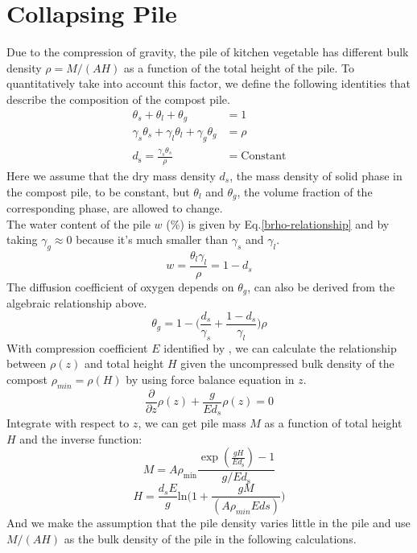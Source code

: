 \documentclass[12pt, letterpaper, titlepage]{article}
\begin{document}
\section{Collapsing Pile}
Due to the compression of gravity, the pile of kitchen vegetable has different bulk density $\rho=M/(AH)$ as a function of the total height of the pile. To quantitatively take into account this factor, we define the following identities that describe the composition of the compost pile.
\begin{align}
    \theta_s+\theta_l+\theta_g &= 1 \\
    \gamma_s\theta_s+\gamma_l\theta_l+\gamma_g\theta_g &= \rho \label{brho-relationship}\\
    d_{\mathrm{s}} = \frac{\gamma_s\theta_s}{\rho} &= \mathrm{Constant}
\end{align}
Here we assume that the dry mass density $d_s$, the mass density of solid phase in the compost pile, to be constant, but $\theta_l$ and $\theta_g$, the volume fraction of the corresponding phase, are allowed to change. \\
The water content of the pile $w$ (\%) is given by Eq.\ref{brho-relationship} and by taking $\gamma_g\approx0$ because it's much smaller than $\gamma_s$ and $\gamma_l$. 
    \begin{equation}
        w = \frac{\theta_l\gamma_l}{\rho} = 1-d_s
    \end{equation}
The diffusion coefficient of oxygen depends on $\theta_g$, can also be derived from the algebraic relationship above. 
     \begin{equation}
        \theta_g = 1-\Big(\frac{d_s}{\gamma_s}+\frac{1-d_s}{\gamma_l}\Big)\rho \label{thetaG}
    \end{equation}
    With compression coefficient $E$ identified by \cite{pile}, we can calculate the relationship between $\rho(z)$ and total height $H$ given the uncompressed bulk density of the compost $\rho_{min}=\rho(H)$ by using force balance equation in $z$.
    \begin{equation*}
    \frac{\partial}{\partial z}\rho(z)+\frac{g}{Ed_s}\rho(z)=0
    \end{equation*}
    Integrate with respect to $z$, we can get pile mass $M$ as a function of total height $H$ and the inverse function:
    $$M = A\rho_{\mathrm{min}}\frac{\exp(\frac{gH}{Ed_{\mathrm{s}}})-1}{g/Ed_{\mathrm{s}}}$$
    \begin{equation}
        H = \frac{d_sE}{g}\mathrm{ln}\Big(1+\frac{gM}{(A\rho_{min}Eds)}\Big) \label{HofM}
    \end{equation}
    And we make the assumption that the pile density varies little in the pile and use $M/(AH)$ as the bulk density of the pile in the following calculations.
\end{document}
